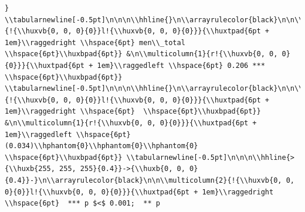 \documentclass[11pt,preprint, authoryear]{elsarticle}
\numberwithin{equation}{section}
\numberwithin{figure}{section}
\numberwithin{table}{section}
\begin{document}
\begin{verbatim}
} \\tabularnewline[-0.5pt]\n\n\n\\hhline{}\n\\arrayrulecolor{black}\n\n\\multicolumn{1}{!{\\huxvb{0, 0, 0}{0}}l!{\\huxvb{0, 0, 0}{0}}}{\\huxtpad{6pt + 1em}\\raggedright \\hspace{6pt} men\\_total \\hspace{6pt}\\huxbpad{6pt}} &\n\\multicolumn{1}{r!{\\huxvb{0, 0, 0}{0}}}{\\huxtpad{6pt + 1em}\\raggedleft \\hspace{6pt} 0.206 *** \\hspace{6pt}\\huxbpad{6pt}} \\tabularnewline[-0.5pt]\n\n\n\\hhline{}\n\\arrayrulecolor{black}\n\n\\multicolumn{1}{!{\\huxvb{0, 0, 0}{0}}l!{\\huxvb{0, 0, 0}{0}}}{\\huxtpad{6pt + 1em}\\raggedright \\hspace{6pt}  \\hspace{6pt}\\huxbpad{6pt}} &\n\\multicolumn{1}{r!{\\huxvb{0, 0, 0}{0}}}{\\huxtpad{6pt + 1em}\\raggedleft \\hspace{6pt} (0.034)\\hphantom{0}\\hphantom{0}\\hphantom{0} \\hspace{6pt}\\huxbpad{6pt}} \\tabularnewline[-0.5pt]\n\n\n\\hhline{>{\\huxb{255, 255, 255}{0.4}}->{\\huxb{0, 0, 0}{0.4}}-}\n\\arrayrulecolor{black}\n\n\\multicolumn{2}{!{\\huxvb{0, 0, 0}{0}}l!{\\huxvb{0, 0, 0}{0}}}{\\huxtpad{6pt + 1em}\\raggedright \\hspace{6pt}  *** p $<$ 0.001;  ** p 
\end{verbatim}
\end{document}
